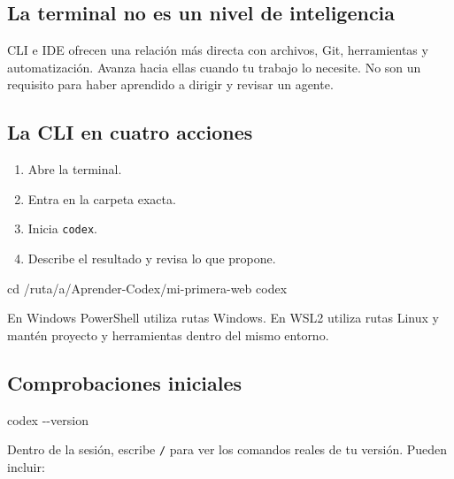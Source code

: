 \documentclass[10pt,a4paper,openany]{book}
\providecommand{\tightlist}{\setlength{\itemsep}{0.18em}\setlength{\parskip}{0pt}}
\newenvironment{Shaded}{}{}
\newcommand{\AttributeTok}[1]{\textcolor[rgb]{0.49,0.56,0.16}{#1}}
\newcommand{\BuiltInTok}[1]{\textcolor[rgb]{0.00,0.50,0.00}{#1}}
\newcommand{\ExtensionTok}[1]{#1}
\newcommand{\NormalTok}[1]{#1}
\renewenvironment{Shaded}
  {\begin{tcolorbox}[
    enhanced,
    breakable,
    colback=CodeBg,
    colframe=Border,
    boxrule=0.5pt,
    arc=2mm,
    left=3mm,
    right=3mm,
    top=2.2mm,
    bottom=2.2mm,
    before skip=0.8em,
    after skip=0.9em
  ]}
  {\end{tcolorbox}}
\begin{document}
\subsection{La terminal no es un nivel de
inteligencia}\label{la-terminal-no-es-un-nivel-de-inteligencia}

CLI e IDE ofrecen una relación más directa con archivos, Git,
herramientas y automatización. Avanza hacia ellas cuando tu trabajo lo
necesite. No son un requisito para haber aprendido a dirigir y revisar
un agente.

\subsection{La CLI en cuatro acciones}\label{la-cli-en-cuatro-acciones}

\begin{enumerate}
\def\labelenumi{\arabic{enumi}.}
\tightlist
\item
  Abre la terminal.
\item
  Entra en la carpeta exacta.
\item
  Inicia \texttt{codex}.
\item
  Describe el resultado y revisa lo que propone.
\end{enumerate}

\begin{Shaded}
\begin{Highlighting}[]
\BuiltInTok{cd}\NormalTok{ /ruta/a/Aprender{-}Codex/mi{-}primera{-}web}
\ExtensionTok{codex}
\end{Highlighting}
\end{Shaded}

En Windows PowerShell utiliza rutas Windows. En WSL2 utiliza rutas Linux
y mantén proyecto y herramientas dentro del mismo entorno.

\subsection{Comprobaciones iniciales}\label{comprobaciones-iniciales}

\begin{Shaded}
\begin{Highlighting}[]
\ExtensionTok{codex} \AttributeTok{{-}{-}version}
\end{Highlighting}
\end{Shaded}

Dentro de la sesión, escribe \texttt{/} para ver los comandos reales de
tu versión. Pueden incluir:
\end{document}
